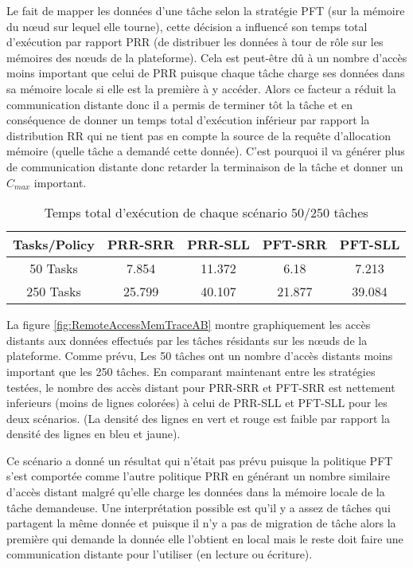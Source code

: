 Le fait de mapper les données d'une tâche selon la stratégie PFT (sur la mémoire du nœud sur lequel elle tourne), cette décision a influencé son temps total d'exécution par rapport PRR (de distribuer les données à tour de rôle sur les mémoires des nœuds de la plateforme). Cela est peut-être dû à un nombre d'accès moins important que celui de PRR puisque chaque tâche charge ses données dans sa mémoire locale si elle est la première à y accéder. Alors ce facteur a réduit la communication distante donc il a permis de terminer tôt la tâche et en conséquence  de donner un temps total d'exécution inférieur par rapport la distribution RR qui ne tient pas en compte la source de la requête d'allocation mémoire (quelle tâche a demandé cette donnée\?). C'est pourquoi il va générer plus de communication distante donc retarder la terminaison de la tâche et donner un $C_{max}$ important.
%
\begin{table}[h!]
\centering
\begin{tabular}{| c | c | c | c | c |} 
\hline
Tasks/Policy	& PRR-SRR 	& PRR-SLL 	& PFT-SRR 	& PFT-SLL 	\\ [0.5ex] \hline
50 Tasks 		& 7.854 		& 11.372 		& 6.18			& 7.213 		\\ [0.5ex] \hline
250 Tasks		& 25.799 		& 40.107 		& 21.877 		& 39.084 		\\ [0.5ex] \hline
\hline
\end{tabular}
\caption{Temps total d'exécution de chaque scénario 50/250 tâches}
\label{table:TotalExeTimeSCAB00}
\end{table}

La figure \ref{fig:RemoteAccessMemTraceAB} montre graphiquement les accès distants aux données effectués par les tâches résidants sur les nœuds de la plateforme. Comme prévu, Les 50 tâches ont un nombre d'accès distants moins important que les 250 tâches. En comparant maintenant entre les stratégies testées, le nombre des accès distant pour PRR-SRR et PFT-SRR est nettement inferieurs (moins de lignes colorées) à celui de PRR-SLL et PFT-SLL pour les deux scénarios. (La densité des lignes en vert et rouge est faible par rapport la densité des lignes en bleu et jaune). 

Ce scénario a donné un résultat qui n'était pas prévu puisque la politique PFT s'est comportée comme l'autre politique PRR en générant un nombre similaire d'accès distant malgré qu'elle charge les données dans la mémoire locale de la tâche demandeuse. Une interprétation possible est qu'il y a assez de tâches qui partagent la même donnée et puisque il n'y a pas de  migration de tâche alors la première qui demande la donnée elle l'obtient en local mais le reste doit faire une communication distante pour l'utiliser (en lecture ou écriture).

